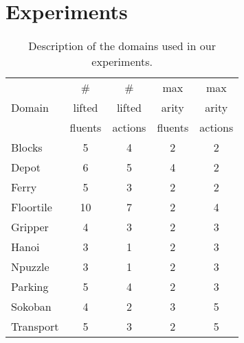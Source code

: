 \documentclass[letterpaper]{article} %
\newtheorem{theorem}{Theorem}
\begin{document}

\section{Experiments}

\begin{table}[t]
\centering
\small
\begin{tabular}{l|c|c|c|c}
\hline
            &               \#&             \# &        max &       max  \\
        Domain    & lifted  & lifted & arity & arity \\
            &fluents&actions&fluents&actions  \\ 
\hline

Blocks      & 5                 & 4                 &2                  &2                 \\
Depot      & 6                 & 5                 &4                  &2                    \\
Ferry       & 5                 & 3                 &2                  &2              \\
Floortile   & 10                & 7                 &2                  &4               \\
Gripper     & 4                 & 3                 &2                  &3              \\
Hanoi       & 3                 & 1                 &2                  &3                \\
Npuzzle     & 3                 & 1                 &2                  &3               \\
Parking     & 5                 & 4                 &2                  &3                  \\
Sokoban     & 4                 & 2                 &3                  &5                 \\
Transport      & 5                 & 3                 &2                  &5                 \\
\hline
\end{tabular}
\caption{Description of the domains used in our experiments.}
\label{tab:domains}
\end{table}
\end{document}
